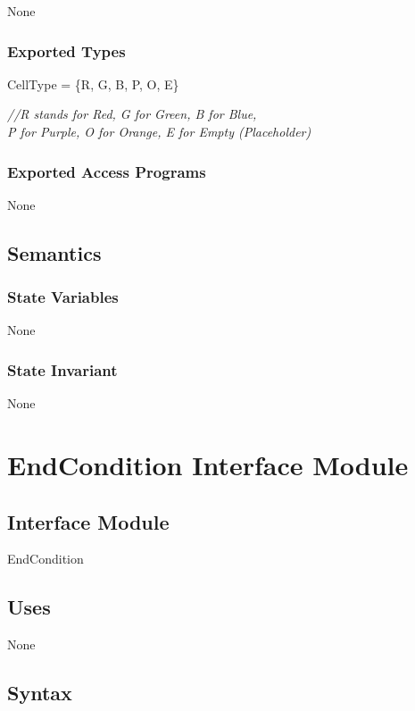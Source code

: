 \documentclass[12pt]{article}
\begin{document}
None

\subsubsection* {Exported Types}

CellType = \{R, G, B, P, O, E\}

\medskip

\noindent \textit{//R stands for Red, G for Green, B for Blue, \\
                    P for Purple, O for Orange, E for Empty (Placeholder)}

\subsubsection* {Exported Access Programs}

None

\subsection* {Semantics}

\subsubsection* {State Variables}

None

\subsubsection* {State Invariant}

None

\newpage

\section* {EndCondition Interface Module}

\subsection* {Interface Module}

EndCondition

\subsection*{Uses}

None

\subsection* {Syntax}
\end{document}
